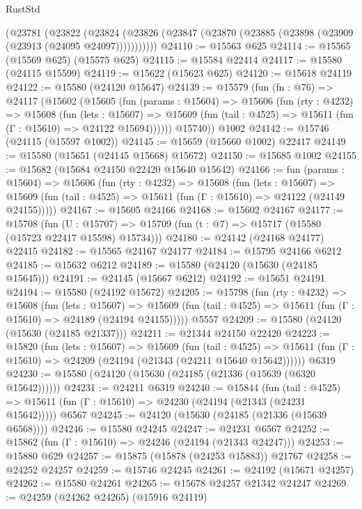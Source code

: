\begin{lexlean}{RustStd}
\begin{coremodule}
    (@23781
      (@23822
        (@23824 (@23826 (@23847 (@23870 (@23885 (@23898 (@23909 (@23913 (@24095 @24097)))))))))))
@24110 := @15563 @625
@24114 := @15565 (@15569 @625) (@15575 @625)
@24115 := @15584 @22414
@24117 := @15580 (@24115 @15599)
@24119 := @15622 (@15623 @625)
@24120 := @15618 @24119
@24122 := @15580 (@24120 @15647)
@24139 := @15579
    (fun (fn : @76) =>
    @24117
      (@15602
        (@15605
          (fun (params : @15604) =>
          @15606
            (fun (rty : @4232) =>
            @15608
              (fun (lets : @15607) =>
              @15609 (fun (tail : @4525) => @15611 (fun (Γ : @15610) => @24122 @15694))))))
        @15740))
    @1002
@24142 := @15746 (@24115 (@15597 @1002))
@24145 := @15659 (@15660 @1002) @22417
@24149 := @15580 (@15651 (@24145 @15668) @15672)
@24150 := @15685 @1002
@24155 := @15682 (@15684 @24150 @22420 @15640 @15642)
@24166 := fun (params : @15604) =>
  @15606
    (fun (rty : @4232) =>
    @15608
      (fun (lets : @15607) =>
      @15609 (fun (tail : @4525) => @15611 (fun (Γ : @15610) => @24122 (@24149 @24155)))))
@24167 := @15605 @24166
@24168 := @15602 @24167
@24177 := @15708
    (fun (U : @15707) => @15709 (fun (t : @7) => @15717 (@15580 (@15723 @22417 @15598) @15734)))
@24180 := @24142 (@24168 @24177) @22415
@24182 := @15565 @24167 @24177
@24184 := @15795 @24166 @6212
@24185 := @15632 @6212
@24189 := @15580 (@24120 (@15630 (@24185 @15645)))
@24191 := @24145 (@15667 @6212)
@24192 := @15651 @24191
@24194 := @15580 (@24192 @15672)
@24205 := @15798
    (fun (rty : @4232) =>
    @15608
      (fun (lets : @15607) =>
      @15609 (fun (tail : @4525) => @15611 (fun (Γ : @15610) => @24189 (@24194 @24155)))))
    @5557
@24209 := @15580 (@24120 (@15630 (@24185 @21337)))
@24211 := @21344 @24150 @22420
@24223 := @15820
    (fun (lets : @15607) =>
    @15609
      (fun (tail : @4525) =>
      @15611 (fun (Γ : @15610) => @24209 (@24194 (@21343 (@24211 @15640 @15642))))))
    @6319
@24230 := @15580 (@24120 (@15630 (@24185 (@21336 (@15639 (@6320 @15642))))))
@24231 := @24211 @6319
@24240 := @15844
    (fun (tail : @4525) => @15611 (fun (Γ : @15610) => @24230 (@24194 (@21343 (@24231 @15642)))))
    @6567
@24245 := @24120 (@15630 (@24185 (@21336 (@15639 @6568))))
@24246 := @15580 @24245
@24247 := @24231 @6567
@24252 := @15862 (fun (Γ : @15610) => @24246 (@24194 (@21343 @24247)))
@24253 := @15880 @629
@24257 := @15875 (@15878 (@24253 @15883)) @21767
@24258 := @24252 @24257
@24259 := @15746 @24245
@24261 := @24192 (@15671 @24257)
@24262 := @15580 @24261
@24265 := @15678 @24257 @21342 @24247
@24269 := @24259 (@24262 @24265) (@15916 @24119)

\end{coremodule}
\end{lexlean}

